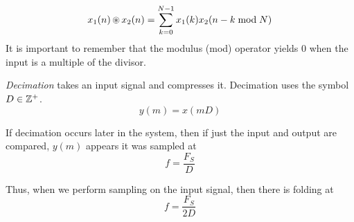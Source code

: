 \begin{equation}\label{eq:Circular_Convolution-Simplified}
  x_{1}(n) \operatorname{\circledast} x_{2}(n) = \sum\limits_{k=0}^{N-1} x_{1}(k) x_{2}(n-k \bmod N)
\end{equation}
It is important to remember that the modulus (mod) operator yields 0 when the input is a multiple of the divisor.

\begin{definition}[Decimation]\label{def:Decimation}
  \emph{Decimation} takes an input signal and compresses it.
  Decimation uses the symbol $D \in \operatorname{\mathbb{Z}^{+}}$.
  \begin{equation*}
    y(m) = x(mD)
  \end{equation*}

  If decimation occurs later in the system, then if just the input and output are compared, $y(m)$ appears it was sampled at
  \begin{equation}\label{eq:Input_Output_Decimation}
    f = \frac{F_{S}}{D}
  \end{equation}

  Thus, when we perform sampling on the input signal, then there is folding at
  \begin{equation}\label{eq:Decimation_Sampling_Frequency_Change}
    f = \frac{F_{S}}{2D}
  \end{equation}
\end{definition}

